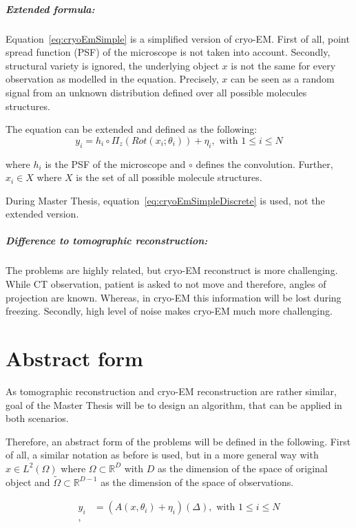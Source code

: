\subparagraph{Extended formula:} 
Equation~\ref{eq:cryoEmSimple} is a simplified version of cryo-EM.
First of all, point spread function (PSF) of the microscope is not taken into account.
Secondly, structural variety is ignored, the underlying object $x$ is not the same 
for every observation as modelled in the equation. 
Precisely, $x$ can be seen as a random signal from an unknown distribution defined over all possible molecules structures.

The equation can be extended and defined as the following:
\begin{equation}
    \label{eq:cryoEmExtended}
    y_i = h_i \circ \Pi_z ( Rot (x_i; \theta_i)) + \eta_i, \text{ with } 1 \leq i \leq N
\end{equation}

where $h_i$ is the PSF of the microscope and $\circ$ defines the convolution.
Further, $x_i \in X$ where $X$ is the set of all possible molecule structures.


\begin{tcolorbox}[colback=red!5!white,colframe=red!75!black]
    During Master Thesis, equation~\ref{eq:cryoEmSimpleDiscrete} is used, not the extended version.
\end{tcolorbox}


\subparagraph{Difference to tomographic reconstruction:}
The problems are highly related, but cryo-EM reconstruct is more challenging.
While CT observation, patient is asked to not move and therefore, angles of projection are known.
Whereas, in cryo-EM this information will be lost during freezing.
Secondly, high level of noise makes cryo-EM much more challenging.


\section{Abstract form}
As tomographic reconstruction and cryo-EM reconstruction are rather similar, 
goal of the Master Thesis will be to design an algorithm, that can be applied in both scenarios.

Therefore, an abstract form of the problems will be defined in the following.
First of all, a similar notation as before is used, but in a more general way with
$x \in L^2(\Omega)$ where $\Omega \subset \mathbb{R}^D$ with $D$ as the dimension of the space of original object
and $\tilde{\Omega} \subset \mathbb{R}^{D-1}$ as the dimension of the space of observations.


\begin{equation}
    \begin{aligned}
        y_i &= \left( A(x, \theta_i) + \eta_i \right) (\Delta), \text{ with } 1 \leq i \leq N\\,
    \end{aligned}
\end{equation}

